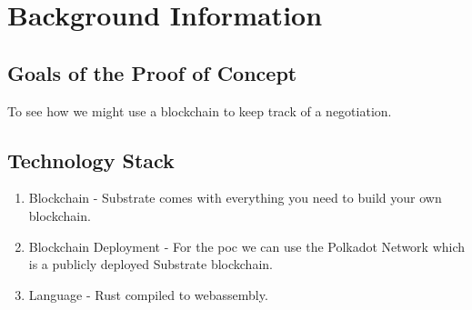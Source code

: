 \chapter{Background Information}

\section{Goals of the Proof of Concept}

To see how we might use a blockchain to keep track of a negotiation. 

\section{Technology Stack}

\begin{enumerate}
    \item Blockchain - Substrate \cite{substrate} comes with everything you need to 
    build your own blockchain.
    \item Blockchain Deployment - For the \acrshort{poc} we can use the Polkadot Network 
    \cite{polkadot} which is a publicly deployed Substrate blockchain.
    \item Language - Rust compiled to webassembly.
\end{enumerate}